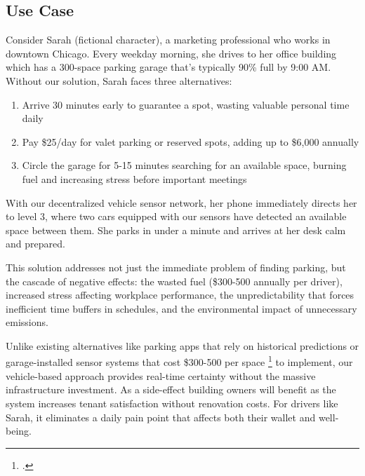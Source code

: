 
\subsection{Use Case}

Consider Sarah (fictional character), a marketing professional who works in downtown Chicago. Every weekday morning, she drives to her office building which has a 300-space parking garage that's typically 90\% full by 9:00 AM. Without our solution, Sarah faces three alternatives:

\begin{enumerate}[leftmargin=*]
  \item Arrive 30 minutes early to guarantee a spot, wasting valuable personal time daily
  \item Pay \$25/day for valet parking or reserved spots, adding up to \$6,000 annually
  \item Circle the garage for 5-15 minutes searching for an available space, burning fuel and increasing stress before important meetings
\end{enumerate}

With our decentralized vehicle sensor network, her phone immediately directs her to level 3, where two cars equipped with our sensors have detected an available space between them. She parks in under a minute and arrives at her desk calm and prepared.

This solution addresses not just the immediate problem of finding parking, but the cascade of negative effects: the wasted fuel (\$300-500 annually per driver), increased stress affecting workplace performance, the unpredictability that forces inefficient time buffers in schedules, and the environmental impact of unnecessary emissions.

Unlike existing alternatives like parking apps that rely on historical predictions or garage-installed sensor systems that cost \$300-500 per space \footcite{ParkingLogix2024} to implement, our vehicle-based approach provides real-time certainty without the massive infrastructure investment. As a side-effect building owners will benefit as the system increases tenant satisfaction without renovation costs. For drivers like Sarah, it eliminates a daily pain point that affects both their wallet and well-being.